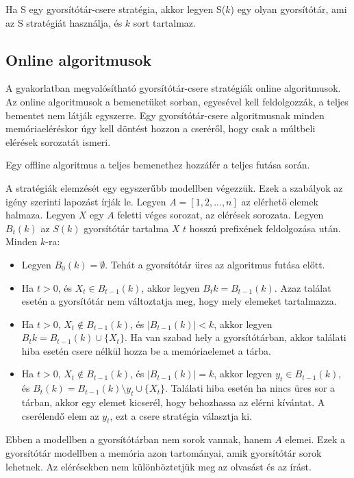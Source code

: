 \documentclass[12pt]{report}
\begin{document}
Ha S egy gyorsítótár-csere stratégia,
akkor legyen S($k$) egy olyan gyorsítótár,
ami az S stratégiát használja,
és $k$ sort tartalmaz.

\subsection{Online algoritmusok}

A gyakorlatban megvalósítható gyorsítótár-csere stratégiák online algoritmusok.
Az online algoritmusok a bemenetüket sorban, egyesével kell feldolgozzák,
a teljes bementet nem látják egyszerre.
Egy gyorsítótár-csere algoritmusnak minden memóriaeléréskor
úgy kell döntést hozzon a cseréről, hogy csak a múltbeli
elérések sorozatát ismeri.

Egy offline algoritmus a teljes bemenethez hozzáfér a teljes futása során.

\bigskip

A stratégiák elemzését egy egyszerűbb modellben\cite{stack-algorithm} végezzük.
Ezek a szabályok az igény szerinti lapozást írják le.
Legyen $A = [1, 2, ..., n]$ az elérhető elemek halmaza.
Legyen $X$ egy $A$ feletti véges sorozat, az elérések sorozata.
Legyen $B_t(k)$ az $S(k)$ gyorsítótár tartalma $X$ $t$ hosszú prefixének
feldolgozása után.
Minden $k$-ra:
\begin{itemize}
\item
Legyen $B_0(k) = \emptyset$. Tehát a gyorsítótár üres az algoritmus futása előtt.
\item
Ha $t > 0$, és $X_t \in B_{t-1}(k)$,
akkor legyen $B_t{k} = B_{t-1}(k)$. Azaz találat esetén a gyorsítótár nem változtatja meg, hogy mely elemeket tartalmazza.
\item
Ha $t > 0$, $X_t \notin B_{t-1}(k)$, és $|B_{t-1}(k)| < k$,
akkor legyen $B_t{k} = B_{t-1}(k) \cup \{X_t\}$.
Ha van szabad hely a gyorsítótárban, akkor találati hiba esetén csere nélkül hozza be a memóriaelemet a tárba.
\item Ha $t > 0$, $X_t \notin B_{t-1}(k)$, és $|B_{t-1}(k)| = k$,
akkor legyen $y_t \in B_{t-1}(k)$, és $B_t(k) = B_{t-1}(k) \setminus {y_t} \cup \{X_t\}$.
Találati hiba esetén ha nincs üres sor a tárban, akkor egy elemet kicserél, hogy behozhassa az elérni kívántat.
A cserélendő elem az $y_t$, ezt a csere stratégia választja ki.
\end{itemize}

Ebben a modellben a gyorsítótárban nem sorok vannak, hanem $A$ elemei.
Ezek a gyorsítótár modellben a memória azon tartományai,
amik gyorsítótár sorok lehetnek.
Az elérésekben nem különböztetjük meg az olvasást és az írást.
\end{document}
